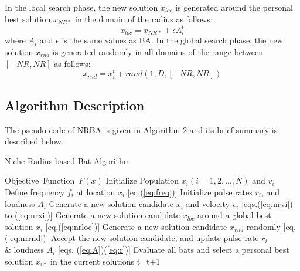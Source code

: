 \documentclass[conference]{IEEEtran}
\begin{document}
In the local search phase, the new solution $x_{loc}$ is generated around the personal best solution $x_{NR*}$ in the domain of the radius as follows:
\begin{equation}
\label{eq:nrloc}
x_{loc}=x_{NR*} + \epsilon A_i^t
\end{equation}
where $A_i$ and $\epsilon$ is the same values as BA.
In the global search phase, the new solution $x_{rnd}$ is generated randomly in all domains of the range between $[-NR, NR]$ as follows: 
\begin{equation}
\label{eq:nrrnd}
x_{rnd}=x_i^t + rand(1,D,[-NR, NR])
\end{equation}

\subsection{Algorithm Description}
The pseudo code of NRBA is given in Algorithm 2 and its brief summary is described below.
\begin{algorithm}[H]
\caption{Niche Radius-based Bat Algorithm}
\label{code:ba}
\begin{algorithmic}[2]
\REQUIRE Objective\ Function\ $F(x)$
\STATE Initialize Population $x_i(i=1,2,..., N)$ and $v_i$\\
\STATE Define frequency $f_i$ at location $x_i$ [eq.(\ref{eq:freq})]
\STATE Initialize pulse rates $r_i$, and loudness $A_i$
\STATE Generate a new solution candidate $x_i$ and velocity $v_i$ [eqs.(\ref{eq:nrvi}) to (\ref{eq:nrxi})]
\ENDIF
{}
\STATE Generate a new solution candidate $x_{loc}$ around a global best solution $x_i$ [eq.(\ref{eq:nrloc})] 
\ENDIF
\STATE Generate a new solution candidate $x_{rnd}$ randomly [eq.(\ref{eq:nrrnd})]
\STATE Accept the new solution candidate, and update pulse rate $r_i$ \\ \& loudness $A_i$ [eqs. (\ref{eq:A})(\ref{eq:r})]  
\ENDIF
\STATE Evaluate all bats and select a personal best solution $x_{i*}$ in the current solutions
\ENDFOR
\STATE t=t+1
\ENDWHILE
\end{algorithmic}
\end{algorithm}
\end{document}
